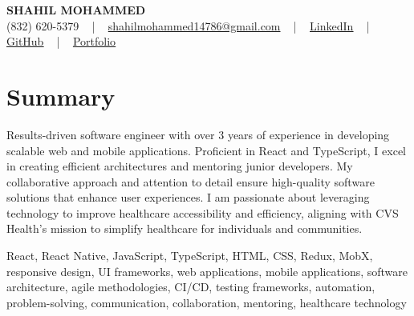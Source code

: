 \documentclass[letterpaper,10pt]{article}
\begin{document}
\begin{center}
    {\fontsize{14pt}{12pt}\selectfont \textbf{\MakeUppercase{Shahil Mohammed}}}\\ \vspace{2pt}
    \fontsize{10pt}{12pt}\selectfont (832) 620-5379 ~ | ~ \href{mailto:shahilmohammed14786@gmail.com}{shahilmohammed14786@gmail.com} ~ | ~  
    \href{https://www.linkedin.com/in/shahil-mohammed-9652931a1/}{\color{blue}\underline{LinkedIn}}  ~ | ~ 
    \href{https://github.com/freakbeast14}{\color{blue}\underline{GitHub}} ~ | ~ 
    \href{https://shahil-mohammed.netlify.app/}{\color{blue}\underline{Portfolio}}
    \vspace{-8pt}
\end{center}

\section{Summary}
\vspace{-2pt}\fontsize{8pt}{9pt}\selectfont
Results-driven software engineer with over 3 years of experience in developing scalable web and mobile applications. Proficient in React and TypeScript, I excel in creating efficient architectures and mentoring junior developers. My collaborative approach and attention to detail ensure high-quality software solutions that enhance user experiences. I am passionate about leveraging technology to improve healthcare accessibility and efficiency, aligning with CVS Health's mission to simplify healthcare for individuals and communities.
 \vspace{-5pt}
 
{\fontsize{1pt}{1pt}\selectfont\color{white}
React, React Native, JavaScript, TypeScript, HTML, CSS, Redux, MobX, responsive design, UI frameworks, web applications, mobile applications, software architecture, agile methodologies, CI/CD, testing frameworks, automation, problem-solving, communication, collaboration, mentoring, healthcare technology
}
\vspace{-8pt}

\vspace{-2pt}
\end{document}
